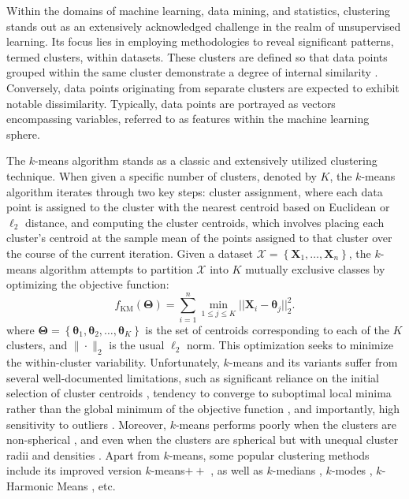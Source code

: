 \documentclass[12pt]{article}
\newcommand{\bX}{\boldsymbol{X}}
\newcommand{\btheta}{\boldsymbol{\theta}}
\newcommand{\bTheta}{\boldsymbol{\Theta}}
\begin{document}
Within the domains of machine learning, data mining, and statistics, clustering stands out as an extensively acknowledged challenge in the realm of unsupervised learning. Its focus lies in employing methodologies to reveal significant patterns, termed clusters, within datasets. These clusters are defined so that data points grouped within the same cluster demonstrate a degree of internal similarity \cite{Xu2015}. Conversely, data points originating from separate clusters are expected to exhibit notable dissimilarity. Typically, data points are portrayed as vectors encompassing variables, referred to as features within the machine learning sphere.

The $k$-means algorithm \cite{llyod-kmeans} stands as a classic and extensively utilized clustering technique. When given a specific number of clusters, denoted by $K$, the $k$-means algorithm iterates through two key steps: cluster assignment, where each data point is assigned to the cluster with the nearest centroid based on Euclidean or $\ell_2$ distance, and computing the cluster centroids, which involves placing each cluster's centroid at the sample mean of the points assigned to that cluster over the course of the current iteration. Given a dataset $\mathcal{X}=\left\{{\bX}_1, \ldots, {\bX}_n\right\}$, the $k$-means algorithm attempts to partition $\mathcal{X}$ into $K$ mutually exclusive classes by optimizing the objective function: 
\begin{equation}
    f_{\operatorname{KM}}(\bTheta) = \sum_{i=1}^n \displaystyle\min_{1 \leq j \leq K} ||\bX_i-\btheta_j||_2^2.
\end{equation}
where $\bTheta=\left\{\btheta_1, \btheta_2, \ldots, \btheta_K\right\}$ is the set of centroids corresponding to each of the $K$ clusters, and $\|\cdot\|_2$ is the usual $\ell_2$ norm. This optimization seeks to minimize the within-cluster variability.
Unfortunately, $k$-means and its variants suffer from several well-documented limitations, such as significant reliance on the initial selection of cluster centroids \cite{pmlr-v70-bachem17b}, tendency to converge to suboptimal local minima rather than the global minimum of the objective function \cite{xu-lange-2019}, and importantly, high sensitivity to outliers \cite{K-means-outliers}. Moreover, $k$-means performs poorly when the clusters are non-spherical \cite{spectral-andrew-ng}, and even when the clusters are spherical but with unequal cluster radii and densities \cite{Raykov2016-mg}. Apart from $k$-means, some popular clustering methods include its improved version $k$-means$++$ \cite{Arthur2007kmeansTA}, as well as $k$-medians \cite{bradley-k-median,k-median}, $k$-modes \cite{Chaturvedi2001}, $k$-Harmonic Means \cite{Zhang-1999-KHM}, etc.
\end{document}
